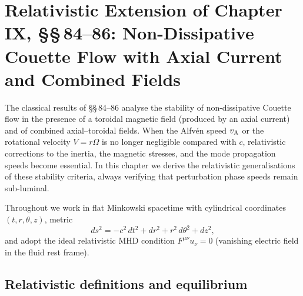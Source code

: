 %
%
\chapter*{Relativistic Extension of Chapter IX, \S\S\,84--86:
Non-Dissipative Couette Flow with Axial Current and Combined Fields}
\label{ch:rel-ch9-sec84-86}

The classical results of \S\S\,84--86 analyse the stability of
non-dissipative Couette flow in the presence of a toroidal magnetic
field (produced by an axial current) and of combined axial--toroidal
fields.  When the Alfv\'en speed $v_{\mathrm{A}}$ or the rotational velocity
$V = r\Omega$ is no longer negligible compared with $c$, relativistic
corrections to the inertia, the magnetic stresses, and the mode
propagation speeds become essential.  In this chapter we derive the
relativistic generalisations of these stability criteria, always
verifying that perturbation phase speeds remain sub-luminal.

Throughout we work in flat Minkowski spacetime with cylindrical
coordinates $(t,r,\theta,z)$, metric
\begin{equation}
  ds^2 = -c^2\,dt^2 + dr^2 + r^2\,d\theta^2 + dz^2,
  \label{eq:rel9-cyl-metric}
\end{equation}
and adopt the ideal relativistic MHD condition $F^{\mu\nu}u_\nu = 0$
(vanishing electric field in the fluid rest frame).

\section{Relativistic definitions and equilibrium}
\label{sec:rel9-84-prelim}

